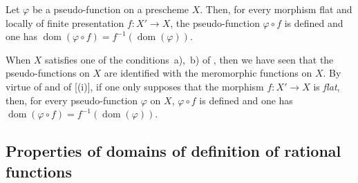\begin{corollary}[20.3.12]
\label{IV.20.3.12}
Let $\varphi$ be a pseudo-function on a prescheme $X$.
Then, for every morphism flat and locally of finite presentation $f:X'\to X$, the pseudo-function $\varphi\circ f$ is defined and one has $\operatorname{dom}(\varphi\circ f)=f^{-1}(\operatorname{dom}(\varphi))$.
\end{corollary}

\begin{remark}[20.3.13]
\label{IV.20.3.13}
When $X$ satisfies one of the conditions~a),~b) of , then we have seen  that the pseudo-functions on $X$ are identified with the meromorphic functions on $X$.
By virtue of  and of [(i)], if one only supposes that the morphism $f:X'\to X$ is \emph{flat}, then, for every pseudo-function $\varphi$ on $X$, $\varphi\circ f$ is defined and one has $\operatorname{dom}(\varphi\circ f)=f^{-1}(\operatorname{dom}(\varphi))$.
\end{remark}

\subsection{Properties of domains of definition of rational functions}
\label{IV.20.4}

